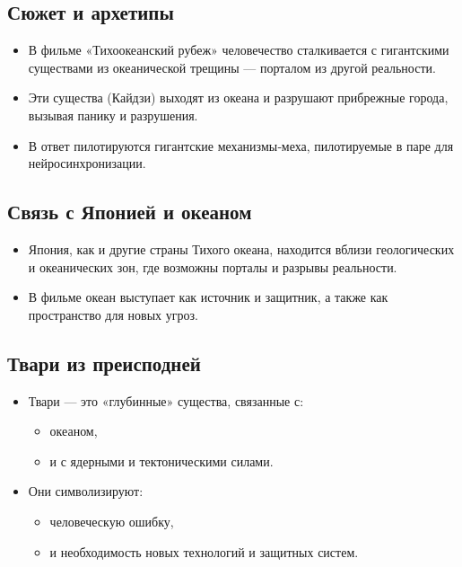 \documentclass[12pt]{article}
\begin{document}
\subsection{Сюжет и архетипы}

\begin{itemize}
  \item В фильме «Тихоокеанский рубеж» человечество сталкивается с гигантскими существами из океанической трещины — порталом из другой реальности.
  \item Эти существа (Кайдзи) выходят из океана и разрушают прибрежные города, вызывая панику и разрушения.
  \item В ответ пилотируются гигантские механизмы‑меха, пилотируемые в паре для нейросинхронизации.
\end{itemize}

\subsection{Связь с Японией и океаном}

\begin{itemize}
  \item Япония, как и другие страны Тихого океана, находится вблизи геологических и океанических зон, где возможны порталы и разрывы реальности.
  \item В фильме океан выступает как источник и защитник, а также как пространство для новых угроз.
\end{itemize}

\subsection{Твари из преисподней}

\begin{itemize}
  \item Твари — это «глубинные» существа, связанные с:
    \begin{itemize}
      \item океаном,
      \item и с ядерными и тектоническими силами.
    \end{itemize}
  \item Они символизируют:
    \begin{itemize}
      \item человеческую ошибку,
      \item и необходимость новых технологий и защитных систем.
    \end{itemize}
\end{itemize}
\end{document}
